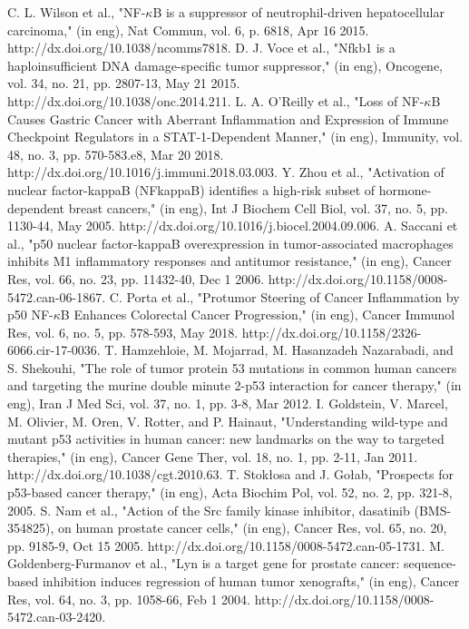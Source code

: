 \documentclass[5p,,preprint,12pt]{elsarticle}
\begin{document}
\begin{thebibliography}{71}
	C. L. Wilson et al., "NF-$\kappa$B is a suppressor of neutrophil-driven hepatocellular carcinoma," (in eng), Nat Commun, vol. 6, p. 6818, Apr 16 2015. http://dx.doi.org/10.1038/ncomms7818.
	D. J. Voce et al., "Nfkb1 is a haploinsufficient DNA damage-specific tumor suppressor," (in eng), Oncogene, vol. 34, no. 21, pp. 2807-13, May 21 2015. http://dx.doi.org/10.1038/onc.2014.211.
	L. A. O'Reilly et al., "Loss of NF-$\kappa$B Causes Gastric Cancer with Aberrant Inflammation and Expression of Immune Checkpoint Regulators in a STAT-1-Dependent Manner," (in eng), Immunity, vol. 48, no. 3, pp. 570-583.e8, Mar 20 2018. http://dx.doi.org/10.1016/j.immuni.2018.03.003.
	Y. Zhou et al., "Activation of nuclear factor-kappaB (NFkappaB) identifies a high-risk subset of hormone-dependent breast cancers," (in eng), Int J Biochem Cell Biol, vol. 37, no. 5, pp. 1130-44, May 2005. http://dx.doi.org/10.1016/j.biocel.2004.09.006.
	A. Saccani et al., "p50 nuclear factor-kappaB overexpression in tumor-associated macrophages inhibits M1 inflammatory responses and antitumor resistance," (in eng), Cancer Res, vol. 66, no. 23, pp. 11432-40, Dec 1 2006. http://dx.doi.org/10.1158/0008-5472.can-06-1867.
	C. Porta et al., "Protumor Steering of Cancer Inflammation by p50 NF-$\kappa$B Enhances Colorectal Cancer Progression," (in eng), Cancer Immunol Res, vol. 6, no. 5, pp. 578-593, May 2018. http://dx.doi.org/10.1158/2326-6066.cir-17-0036.
	T. Hamzehloie, M. Mojarrad, M. Hasanzadeh Nazarabadi, and S. Shekouhi, "The role of tumor protein 53 mutations in common human cancers and targeting the murine double minute 2-p53 interaction for cancer therapy," (in eng), Iran J Med Sci, vol. 37, no. 1, pp. 3-8, Mar 2012.
	I. Goldstein, V. Marcel, M. Olivier, M. Oren, V. Rotter, and P. Hainaut, "Understanding wild-type and mutant p53 activities in human cancer: new landmarks on the way to targeted therapies," (in eng), Cancer Gene Ther, vol. 18, no. 1, pp. 2-11, Jan 2011. http://dx.doi.org/10.1038/cgt.2010.63.
	T. Stokłosa and J. Gołab, "Prospects for p53-based cancer therapy," (in eng), Acta Biochim Pol, vol. 52, no. 2, pp. 321-8, 2005.
	S. Nam et al., "Action of the Src family kinase inhibitor, dasatinib (BMS-354825), on human prostate cancer cells," (in eng), Cancer Res, vol. 65, no. 20, pp. 9185-9, Oct 15 2005. http://dx.doi.org/10.1158/0008-5472.can-05-1731.
	M. Goldenberg-Furmanov et al., "Lyn is a target gene for prostate cancer: sequence-based inhibition induces regression of human tumor xenografts," (in eng), Cancer Res, vol. 64, no. 3, pp. 1058-66, Feb 1 2004. http://dx.doi.org/10.1158/0008-5472.can-03-2420.

\end{thebibliography}
\end{document}
